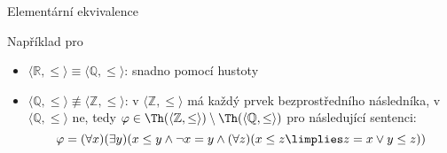 \documentclass{beamer}
\begin{document}
\begin{frame}{Elementární ekvivalence}
    
    \pause

    \bigskip

    \pause
    Například pro 
    \pause
    \begin{itemize}[<+->]
        \item  \alert{$\langle\mathbb R,\leq\rangle\equiv\langle\mathbb Q,\leq\rangle$}: \pause snadno pomocí \alert{hustoty} \pause
        \item \alert{$\langle\mathbb Q,\leq\rangle\not\equiv\langle\mathbb Z,\leq\rangle$}: \pause v $\langle\mathbb Z,\leq\rangle$ má každý prvek bezprostředního následníka, v $\langle\mathbb Q,\leq\rangle$ ne, tedy $\varphi\in\Th(\langle\mathbb Z,\leq\rangle)\setminus\Th(\langle\mathbb Q,\leq\rangle)$ pro následující sentenci:\pause
        $$
        \varphi=(\forall x)(\exists y)(x\leq y\land \neg x=y\land(\forall z)(x\leq z\limplies z=x\lor y\leq z))
        $$        
    \end{itemize}

\end{frame}
\end{document}
